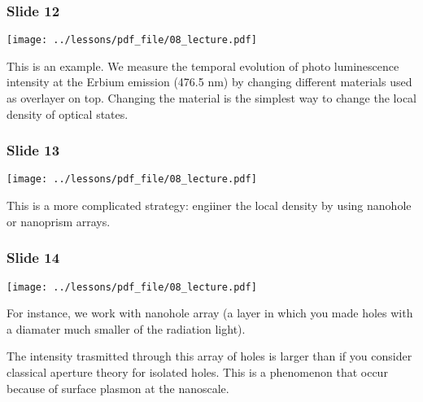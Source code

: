 \documentclass[../main/main.tex]{subfiles}
\begin{document}
\subsubsection*{Slide 12}

\begin{minipage}[]{0.5\linewidth}
\centering
\texttt{[image: ../lessons/pdf\_file/08\_lecture.pdf]}
\end{minipage}
\hspace{0.3cm}
\vspace{0.3cm}
\begin{minipage}[c]{0.47\linewidth}

This is an example. We measure the temporal evolution of photo luminescence intensity at the Erbium emission (476.5 nm) by changing different materials used as overlayer on top.
Changing the material is the simplest way to change the local density of optical states.

\end{minipage}

\subsubsection*{Slide 13}

\begin{minipage}[]{0.5\linewidth}
\centering
\texttt{[image: ../lessons/pdf\_file/08\_lecture.pdf]}
\end{minipage}
\hspace{0.3cm}
\vspace{0.3cm}
\begin{minipage}[c]{0.47\linewidth}

This is a more complicated strategy: engiiner the local density by using nanohole or nanoprism arrays.

\end{minipage}

\subsubsection*{Slide 14}

\begin{minipage}[]{0.5\linewidth}
\centering
\texttt{[image: ../lessons/pdf\_file/08\_lecture.pdf]}
\end{minipage}
\hspace{0.3cm}
\vspace{0.3cm}
\begin{minipage}[c]{0.47\linewidth}

For instance, we work with nanohole array (a layer in which you made holes with a diamater much smaller of the radiation light).

The intensity trasmitted through this array of holes is larger than if you consider classical aperture theory for isolated holes.
This is a phenomenon that occur because of surface plasmon at the nanoscale.

\end{minipage}
\end{document}
